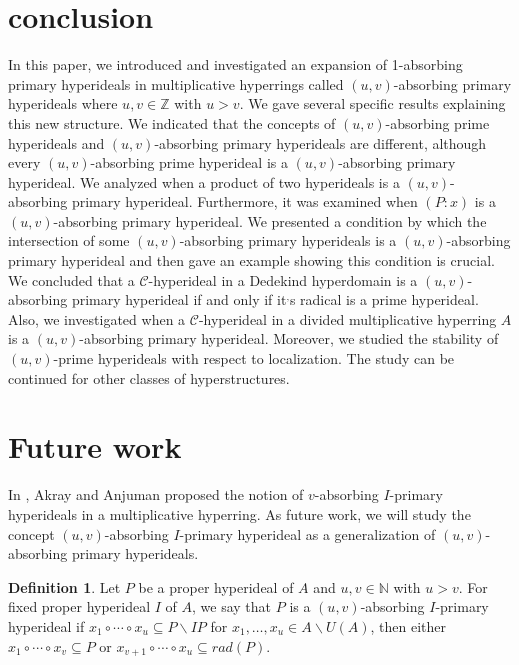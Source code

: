 \documentclass[preprint,review,10pt]{amsart}
\theoremstyle{definition}
\newtheorem{definition}[theorem]{Definition}
\theoremstyle{remark}
\numberwithin{equation}{section}
\begin{document}
\section{conclusion}
In this paper, we introduced and investigated  an expansion of 1-absorbing primary hyperideals in multiplicative hyperrings called $(u,v)$-absorbing primary  hyperideals  where $u,v \in \mathbb{Z}$ with $u>v$. We gave  several specific results explaining this new structure.  We indicated that the  concepts of $(u,v)$-absorbing prime  hyperideals and $(u,v)$-absorbing primary  hyperideals are different, although every $(u,v)$-absorbing prime  hyperideal is a $(u,v)$-absorbing primary  hyperideal. We analyzed when a product of two hyperideals is a $(u,v)$-absorbing primary hyperideal. Furthermore, it was examined when $(P:x)$ is a $(u,v)$-absorbing primary hyperideal. We presented a condition by which the intersection of some $(u,v)$-absorbing primary hyperideals is a $(u,v)$-absorbing primary hyperideal and then gave an example showing this condition is crucial. We concluded that a $\mathcal{C}$-hyperideal in a Dedekind hyperdomain is a $(u,v)$-absorbing primary hyperideal if and
only if it$^,$s radical is a prime hyperideal.
 Also, we investigated when    a $\mathcal{C}$-hyperideal in a divided multiplicative hyperring $A$ is a $(u,v)$-absorbing primary hyperideal. Moreover, we studied the stability of   $(u,v)$-prime hyperideals with respect to localization. The study can be continued for other classes of hyperstructures.
\section{Future work}
In \cite{Akray}, Akray and Anjuman proposed the notion of $v$-absorbing $I$-primary hyperideals in a multiplicative hyperring. As future work, we will study the concept $(u,v)$-absorbing $I$-primary  hyperideal as a generalization of $(u,v)$-absorbing primary  hyperideals. 
\begin{definition}
Let $P$ be a proper hyperideal of $A$ and $u,v \in \mathbb{N}$ with $u >v$. For fixed proper hyperideal $I$ of $A$, we say that $P$ is a  $(u,v)$-absorbing $I$-primary  hyperideal  if     $x_1 \circ \cdots \circ x_u \subseteq P \backslash IP$ for $x_1,\ldots, x_u \in A \backslash U(A)$, then either $x_1 \circ \cdots \circ x_v \subseteq P$ or $x_{v+1} \circ \cdots \circ x_u \subseteq rad(P)$.
\end{definition}
\end{document}
